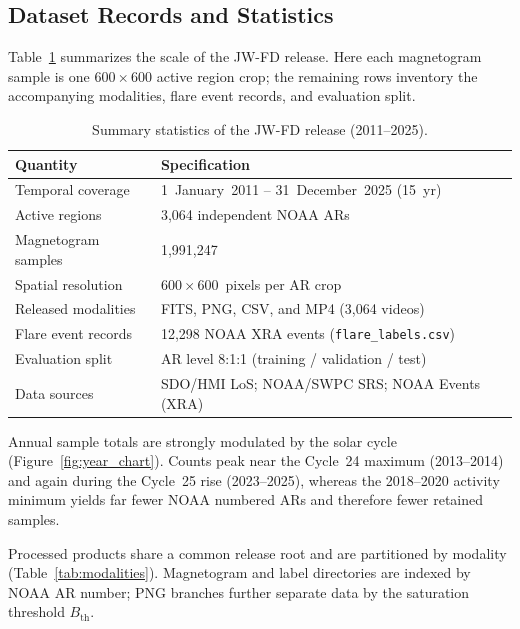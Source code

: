 \documentclass[universe,article,submit,moreauthors]{Definitions/mdpi}
\begin{document}
\subsection{Dataset Records and Statistics}
\label{sec:records}

Table~\ref{tab:summary} summarizes the scale of the JW-FD release. Here each magnetogram sample is one $600\times600$ active region crop; the remaining rows inventory the accompanying modalities, flare event records, and evaluation split.

\begin{table}[H]
\caption{Summary statistics of the JW-FD release (2011--2025).}
\label{tab:summary}
\centering
\small
\begin{tabularx}{\textwidth}{@{}>{\raggedright\arraybackslash}p{4.5cm}X@{}}
\toprule
\textbf{Quantity} & \textbf{Specification} \\
\midrule
Temporal coverage & 1~January~2011 -- 31~December~2025 (15~yr) \\
Active regions & 3{,}064 independent NOAA ARs \\
Magnetogram samples & 1{,}991{,}247 \\
Spatial resolution & $600\times600$~pixels per AR crop \\
Released modalities & FITS, PNG, CSV, and MP4 (3{,}064 videos) \\
Flare event records & 12{,}298 NOAA XRA events (\texttt{flare\_labels.csv}) \\
Evaluation split & AR level 8:1:1 (training / validation / test) \\
Data sources & SDO/HMI LoS; NOAA/SWPC SRS; NOAA Events (XRA) \\
\bottomrule
\end{tabularx}
\end{table}

Annual sample totals are strongly modulated by the solar cycle (Figure~\ref{fig:year_chart}). Counts peak near the Cycle~24 maximum (2013--2014) and again during the Cycle~25 rise (2023--2025), whereas the 2018--2020 activity minimum yields far fewer NOAA numbered ARs and therefore fewer retained samples.



Processed products share a common release root and are partitioned by modality (Table~\ref{tab:modalities}). Magnetogram and label directories are indexed by NOAA AR number; PNG branches further separate data by the saturation threshold $B_{\mathrm{th}}$.
\end{document}
